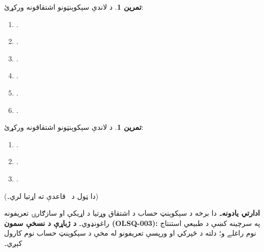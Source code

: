 \documentclass[12pt,a4paper,oneside]{report}
\newcommand{\olfileid}[3]{\gdef\pspart{#1}\gdef\pschapter{#2}\gdef\pssection{#3}}
\gdef\pspart{#2}\gdef\pschapter{#3}\gdef\pssection{}%
\theoremstyle{definition}
\newtheorem{prob}[thm]{تمرين}
\newenvironment{editorial}{\begin{framed}\textbf{ادارتي يادونه۔}\enspace}{\end{framed}}
\begin{document}
\label{olpseg:OLP-0076-B009:start}
\begin{prob}
د لاندې سېکوېنټونو اشتقاقونه ورکړئ:
\begin{enumerate}
\item \LR{$\Sequent (\lforall[x][!A(x)] \land \lforall[y][!B(y)]) \lif
\lforall[z][(!A(z) \land !B(z))]$}.
\item \LR{$\Sequent (\lexists[x][!A(x)] \lor \lexists[y][!B(y)]) \lif
\lexists[z][(!A(z) \lor !B(z))]$}.
\item {}.
\item \LR{$\lforall[x][\lnot !A(x)] \Sequent \lnot\lexists[x][!A(x)]$}.
\item \LR{$\Sequent \lnot\lexists[x][!A(x)] \lif \lforall[x][\lnot !A(x)]$}.
\item {}.
\end{enumerate}
\end{prob}
\label{olpseg:OLP-0076-B009:end}

\label{olpseg:OLP-0076-B010:start}
\begin{prob}
د لاندې سېکوېنټونو اشتقاقونه ورکړئ:
\begin{enumerate}
\item \LR{$\Sequent \lnot\lforall[x][!A(x)] \lif \lexists[x][\lnot!A(x)]$}.
\item {}.
\item {}.
\end{enumerate}
(دا ټول د~\LR{$\RightR{\Contraction}$} قاعدې ته اړتيا لري۔)
\end{prob}
\label{olpseg:OLP-0076-B010:end}

\label{olpseg:OLP-0077-B004:start}
\begin{editorial}
  دا برخه د سېکوېنټ حساب د اشتقاق وړتيا د اړيکې او سازګارۍ
  تعريفونه راغونډوي۔
  \textbf{د ژباړې د نسخې سمون (OLSQ-003):} په سرچينه کښې د طبيعي
  استنتاج نوم راغلے و؛ دلته د څپرکي او ورپسې تعريفونو له مخې د
  سېکوېنټ حساب نوم کارول کېږي۔
\end{editorial}
\label{olpseg:OLP-0077-B004:end}

\label{olpseg:OLP-0077-B005:start}
\olfileid{fol}{seq}{ptn}
\label{olpseg:OLP-0077-B005:end}

\label{olpseg:OLP-0077-B006:start}
\label{olpseg:OLP-0077-B006:end}
\end{document}
